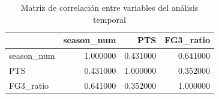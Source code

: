 \begin{table}[H]
\centering
\caption{Matriz de correlación entre variables del análisis temporal}
\label{tab:corr-temporal}
\begin{tabular}{lrrr}
\toprule
 & season\_num & PTS & FG3\_ratio \\
\midrule
season\_num & 1.000000 & 0.431000 & 0.641000 \\
PTS & 0.431000 & 1.000000 & 0.352000 \\
FG3\_ratio & 0.641000 & 0.352000 & 1.000000 \\
\bottomrule
\end{tabular}
\end{table}
